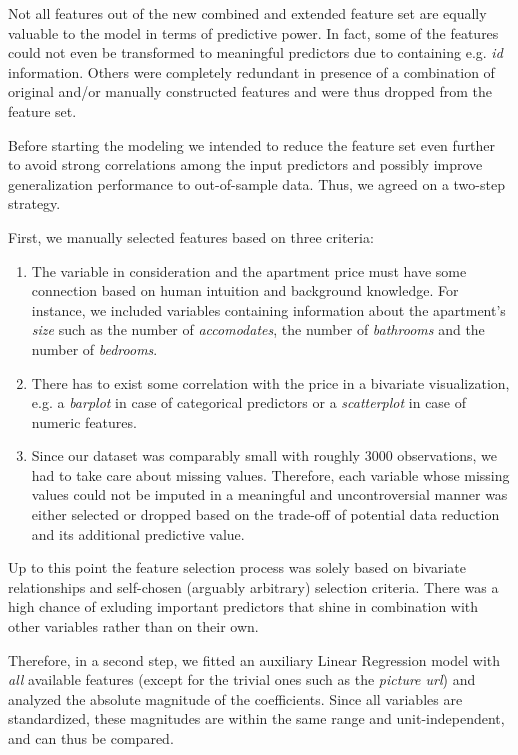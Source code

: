 \documentclass[12pt, letterpaper]{article}
\begin{document}
\begin{appendices}
    Not all features out of the new combined and extended feature set are equally valuable to the model in terms of predictive power.
    In fact, some of the features could not even be transformed to meaningful predictors due to containing e.g. \emph{id} information.
    Others were completely redundant in presence of a combination of original and/or manually constructed features and were thus dropped from the feature set.

    Before starting the modeling we intended to reduce the feature set even further to avoid strong correlations among the input predictors and possibly improve generalization performance to out-of-sample data.
    Thus, we agreed on a two-step strategy.

    First, we manually selected features based on three criteria:
    \begin{enumerate}
        \item The variable in consideration and the apartment price must have some connection based on human intuition and background knowledge. For instance, we included variables containing information about the apartment's \emph{size} such as the number of \emph{accomodates}, the number of \emph{bathrooms} and the number of \emph{bedrooms}.
        \item There has to exist some correlation with the price in a bivariate visualization, e.g. a \emph{barplot} in case of categorical predictors or a \emph{scatterplot} in case of numeric features.
        \item Since our dataset was comparably small with roughly $3000$ observations, we had to take care about missing values.
              Therefore, each variable whose missing values could not be imputed in a meaningful and uncontroversial manner was either selected or dropped based on the trade-off of potential data reduction and its additional predictive value.
    \end{enumerate}

    Up to this point the feature selection process was solely based on bivariate relationships and self-chosen (arguably arbitrary) selection criteria.
    There was a high chance of exluding important predictors that shine in combination with other variables rather than on their own.

    Therefore, in a second step, we fitted an auxiliary Linear Regression model with \emph{all} available features (except for the trivial ones such as the \emph{picture url}) and analyzed the absolute magnitude of the coefficients.
    Since all variables are standardized, these magnitudes are within the same range and unit-independent, and can thus be compared.


\end{appendices}
\end{document}
